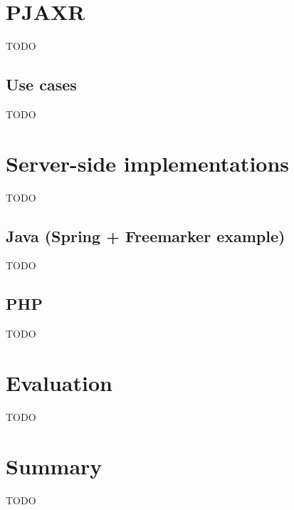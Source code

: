 \documentclass[f,bachelor,binding,twoside,palatino]{WeSTthesis}
\begin{document}
\section{PJAXR}
  TODO
  
  \subsection{Use cases}
  TODO
  
\section{Server-side implementations}
TODO

  \subsection{Java (Spring + Freemarker example)}
  TODO

    \subsection{PHP}
    TODO

\section{Evaluation}
TODO
  
\section{Summary}
TODO

\printglossary
\end{document}
